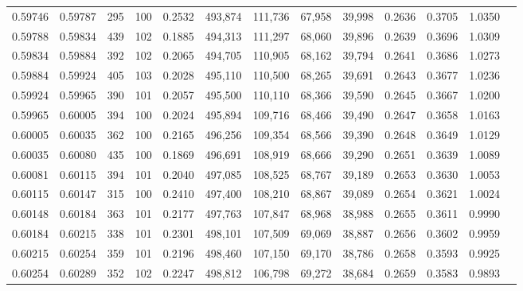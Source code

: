 \begin{tabular}{rrrrrrrrrrrrr}
0.59746 & 0.59787 &   295 & 100 &                                     0.2532 & 493,874 & 111,736 &  67,958 &  39,998 & 0.2636 & 0.3705 & 1.0350 \\
0.59788 & 0.59834 &   439 & 102 &                                     0.1885 & 494,313 & 111,297 &  68,060 &  39,896 & 0.2639 & 0.3696 & 1.0309 \\
0.59834 & 0.59884 &   392 & 102 &                                     0.2065 & 494,705 & 110,905 &  68,162 &  39,794 & 0.2641 & 0.3686 & 1.0273 \\
0.59884 & 0.59924 &   405 & 103 &                                     0.2028 & 495,110 & 110,500 &  68,265 &  39,691 & 0.2643 & 0.3677 & 1.0236 \\
0.59924 & 0.59965 &   390 & 101 &                                     0.2057 & 495,500 & 110,110 &  68,366 &  39,590 & 0.2645 & 0.3667 & 1.0200 \\
0.59965 & 0.60005 &   394 & 100 &                                     0.2024 & 495,894 & 109,716 &  68,466 &  39,490 & 0.2647 & 0.3658 & 1.0163 \\
0.60005 & 0.60035 &   362 & 100 &                                     0.2165 & 496,256 & 109,354 &  68,566 &  39,390 & 0.2648 & 0.3649 & 1.0129 \\
0.60035 & 0.60080 &   435 & 100 &                                     0.1869 & 496,691 & 108,919 &  68,666 &  39,290 & 0.2651 & 0.3639 & 1.0089 \\
0.60081 & 0.60115 &   394 & 101 &                                     0.2040 & 497,085 & 108,525 &  68,767 &  39,189 & 0.2653 & 0.3630 & 1.0053 \\
0.60115 & 0.60147 &   315 & 100 &                                     0.2410 & 497,400 & 108,210 &  68,867 &  39,089 & 0.2654 & 0.3621 & 1.0024 \\
0.60148 & 0.60184 &   363 & 101 &                                     0.2177 & 497,763 & 107,847 &  68,968 &  38,988 & 0.2655 & 0.3611 & 0.9990 \\
0.60184 & 0.60215 &   338 & 101 &                                     0.2301 & 498,101 & 107,509 &  69,069 &  38,887 & 0.2656 & 0.3602 & 0.9959 \\
0.60215 & 0.60254 &   359 & 101 &                                     0.2196 & 498,460 & 107,150 &  69,170 &  38,786 & 0.2658 & 0.3593 & 0.9925 \\
0.60254 & 0.60289 &   352 & 102 &                                     0.2247 & 498,812 & 106,798 &  69,272 &  38,684 & 0.2659 & 0.3583 & 0.9893 \\

\end{tabular}
